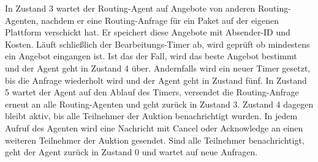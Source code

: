 In Zustand 3 wartet der Routing-Agent auf Angebote von anderen Routing-Agenten, nachdem er eine Routing-Anfrage für ein Paket auf der eigenen Plattform verschickt hat. Er speichert diese Angebote mit Absender-ID und Kosten. Läuft schließlich der Bearbeitungs-Timer ab, wird geprüft ob mindestens ein Angebot eingangen ist. Ist das der Fall, wird das beste Angebot bestimmt und der Agent geht in Zustand 4 über. Andernfalls wird ein neuer Timer gesetzt, bis die Anfrage wiederholt wird und der Agent geht in Zustand fünf. In Zustand 5 wartet der Agent auf den Ablauf des Timers, versendet die Routing-Anfrage erneut an alle Routing-Agenten und geht zurück in Zustand 3. Zustand 4 dagegen bleibt aktiv, bis alle Teilnehmer der Auktion benachrichtigt wurden. In jedem Aufruf des Agenten wird eine Nachricht mit Cancel oder Acknowledge an einen weiteren Teilnehmer der Auktion gesendet. Sind alle Teilnehmer benachrichtigt, geht der Agent zurück in Zustand 0 und wartet auf neue Anfragen.